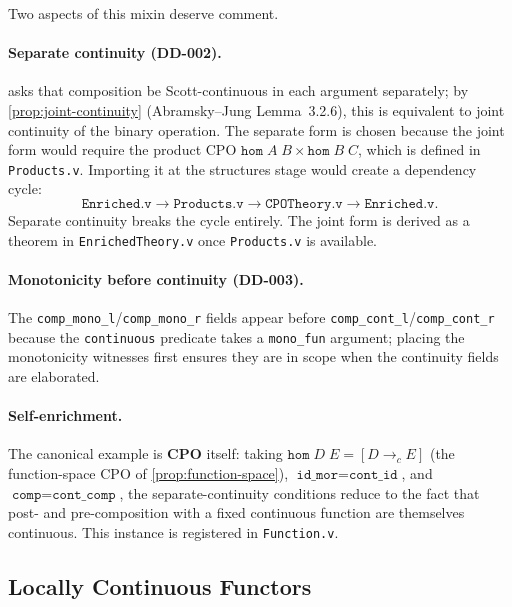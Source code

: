 Two aspects of this mixin deserve comment.

\paragraph{Separate continuity (DD-002).}
 asks that composition be
Scott-continuous in each argument separately; by
\cref{prop:joint-continuity} (Abramsky--Jung Lemma~3.2.6), this is
equivalent to joint continuity of the binary operation.  The separate
form is chosen because the joint form would require the product CPO
$\texttt{hom}\;A\;B \times \texttt{hom}\;B\;C$,  which is defined in
\texttt{Products.v}.  Importing it at the structures stage would create
a dependency cycle:
\[
  \texttt{Enriched.v} \to \texttt{Products.v} \to \texttt{CPOTheory.v}
    \to \texttt{Enriched.v}.
\]
Separate continuity breaks the cycle entirely.
The joint form is derived as a theorem in \texttt{EnrichedTheory.v}
once \texttt{Products.v} is available.

\paragraph{Monotonicity before continuity (DD-003).}
The \texttt{comp\_mono\_l}/\texttt{comp\_mono\_r} fields appear before
\texttt{comp\_cont\_l}/\texttt{comp\_cont\_r} because the
\texttt{continuous} predicate takes a \texttt{mono\_fun} argument;
placing the monotonicity witnesses first ensures they are in scope when
the continuity fields are elaborated.

\paragraph{Self-enrichment.}
The canonical example is \textbf{CPO} itself: taking
$\texttt{hom}\;D\;E = [D \to_c E]$ (the function-space CPO of
\cref{prop:function-space}), $\texttt{id\_mor} = \texttt{cont\_id}$,
and $\texttt{comp} = \texttt{cont\_comp}$, the separate-continuity
conditions reduce to the fact that post- and pre-composition with a
fixed continuous function are themselves continuous.  This instance
is registered in \texttt{Function.v}.

\subsection{Locally Continuous Functors}
\label{sec:meth-lc-functors}

